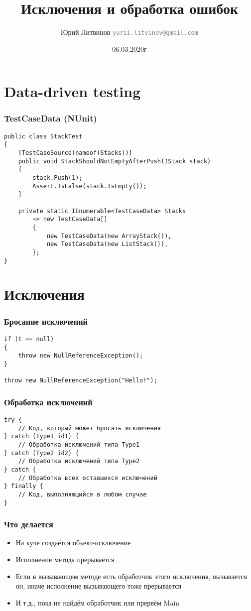 \documentclass[xetex,mathserif,serif]{beamer}
\title{Исключения и обработка ошибок}
\author[Юрий Литвинов]{Юрий Литвинов \newline \textcolor{gray}{\small\texttt{yurii.litvinov@gmail.com}}}
\date{06.03.2020г}
\begin{document}
	
	\frame{\titlepage}

	\section{Data-driven testing}

	\begin{frame}[fragile]
		\frametitle{TestCaseData (NUnit)}
		\begin{verbatim}
public class StackTest
{
    [TestCaseSource(nameof(Stacks))]
    public void StackShouldNotEmptyAfterPush(IStack stack)
    {
        stack.Push(1);
        Assert.IsFalse(stack.IsEmpty());
    }

    private static IEnumerable<TestCaseData> Stacks
        => new TestCaseData[]
        {
            new TestCaseData(new ArrayStack()),
            new TestCaseData(new ListStack()),
        };
}
		\end{verbatim}
	\end{frame}

	\section{Исключения}

	\begin{frame}[fragile]
		\frametitle{Бросание исключений}
		\begin{verbatim}
if (t == null)
{
    throw new NullReferenceException();
}

throw new NullReferenceException("Hello!");
		\end{verbatim}
	\end{frame}

	\begin{frame}[fragile]
		\frametitle{Обработка исключений}
		\begin{verbatim}
try {
    // Код, который может бросать исключения
} catch (Type1 id1) {
    // Обработка исключений типа Type1
} catch (Type2 id2) {
    // Обработка исключений типа Type2
} catch {
    // Обработка всех оставшихся исключений
} finally {
    // Код, выполняющийся в любом случае
}
		\end{verbatim}
	\end{frame}

	\begin{frame}
		\frametitle{Что делается}
		\begin{itemize}
			\item На куче создаётся объект-исключение
			\item Исполнение метода прерывается
			\item Если в вызывающем методе есть обработчик этого исключения, вызывается он, иначе исполнение вызывающего тоже прерывается
			\item И т.д., пока не найдём обработчик или прервём Main
		\end{itemize}
	\end{frame}
\end{document}
